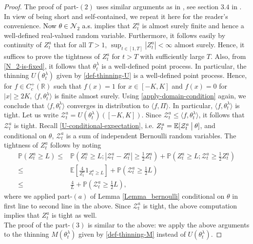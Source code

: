 \documentclass[a4paper,reqno]{amsart}%
\newcommand{\1}{\mathbf 1}
\theoremstyle{mine}
\numberwithin{theorem}{section}
\numberwithin{equation}{section}
\theoremstyle{remark}
\begin{document}
\begin{proof}
    The proof of part-$(2)$ uses similar arguments as in \cite{Shekhar_FP}, see section $3.4$ in \cite{Shekhar_FP}. In view of being short and self-contained, we repeat it here for the reader's convenience. 
    \textcolor{black}{Now $\theta \in \mathcal N_2$ a.s.} implies that $Z_t^a$ is almost surely finite and hence a well-defined real-valued random variable. Furthermore, it follows easily by continuity of $Z_t^a$ that for all $T>1$, $\sup_{t\in [1,T]} |Z_t^a| <\infty$ almost surely. Hence, it suffices to prove the tightness of $Z_t^a$ for $t>T$ with sufficiently large $T$. Also, from \eqref{N_2-is-fixed}, it follows that $\theta_t^\lambda$ is a well-defined point process. In particular, the thinning $U(\theta_t^\lambda)$ given by \eqref{def-thinning-U} is a well-defined point process. Hence, for $f \in C_c^+(\mathbb R)$ such that $f(x)=1$ for $x\in [-K,K]$ and $f(x)=0$ for $|x|\ge 2K$, $\langle f, \theta_t^\lambda \rangle$ is finite almost surely. Using \eqref{apply-domain-condition} again, we conclude that $\langle f, \theta_t^\lambda \rangle$ converges in distribution to $\langle f, \Pi \rangle$. In particular, $\langle f, \theta_t^\lambda \rangle$ is tight. Let us write $\mathcal{Z}_t^a = U(\theta_t^\lambda)([-K, K])$. Since $\mathcal{Z}_t^a \leq \langle f, \theta_t^\lambda \rangle$, it follows that $\mathcal{Z}_t^a$ is tight. Recall \eqref{U-conditional-expectation}, i.e. $Z_t^a = \mathbb{E}[\mathcal{Z}_t^a \hspace{0.8mm}\bigl | \hspace{0.8mm} \theta]$, and conditional on $\theta$, $\mathcal{Z}_t^a$ is a sum of independent Bernoulli random variables. The tightness of $Z_t^a$ follows by noting
\begin{align}
\mathbb{P}(Z_t^a\geq L)\leq & \mathbb{P}\left(Z_t^a\geq L; |\mathcal{Z}_t^a-Z_t^a|\geq \frac12 Z_t^a\right)+\mathbb{P}\left(Z_t^a\geq L; \mathcal{Z}_t^a\ge\frac12 Z_t^a\right)\nonumber\\
\leq & \mathbb{E}\left[\frac{4}{Z_t^a}1_{Z_t^a\geq L}\right]+\mathbb{P}\left(\mathcal{Z}_t^a\geq \frac12 L\right) \nonumber \\
\leq & \frac{4}{L} + \mathbb{P}\left(\mathcal{Z}_t^a\geq \frac12 L\right),\nonumber
\end{align}
where we applied part-$(a)$ of Lemma \ref{Lemma_bernoulli} conditional on $\theta$ in first line to second line in the above. Since $\mathcal{Z}_t^a$ is tight, the above computation implies that $Z_t^a$ is tight as well. \\

The proof of the part-$(3)$ is similar to the above: we apply the above arguments to the thinning $M(\theta_t^\lambda)$ given by \eqref{def-thinning-M} instead of $U(\theta_t^\lambda)$. 
\end{proof}
\end{document}
